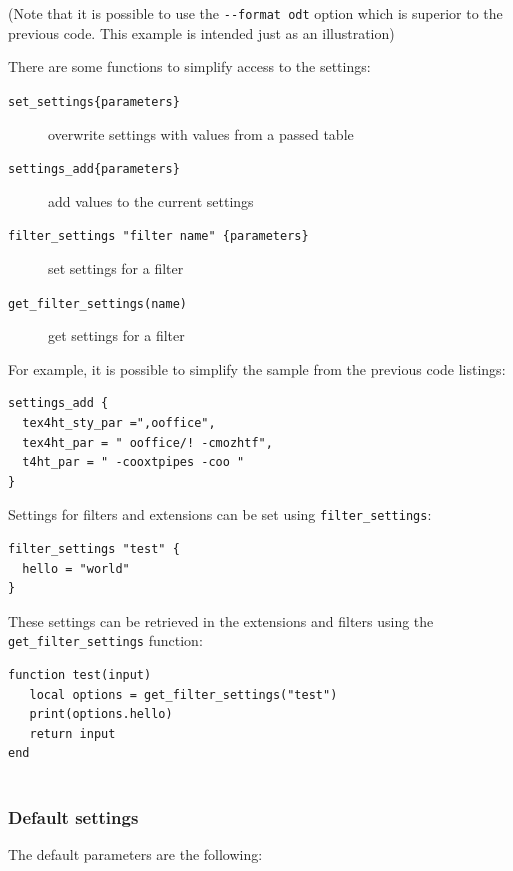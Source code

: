 (Note that it is possible to use the \texttt{-\/-format\ odt} option
which is superior to the previous code. This example is intended just as
an illustration)

There are some functions to simplify access to the settings:

\begin{description}
\item[\texttt{set\_settings\{parameters\}}]
overwrite settings with values from a passed table
\item[\texttt{settings\_add\{parameters\}}]
add values to the current settings
\item[\texttt{filter\_settings\ "filter\ name"\ \{parameters\}}]
set settings for a filter
\item[\texttt{get\_filter\_settings(name)}]
get settings for a filter
\end{description}

For example, it is possible to simplify the sample from the previous
code listings:

\begin{verbatim}
settings_add {
  tex4ht_sty_par =",ooffice",
  tex4ht_par = " ooffice/! -cmozhtf",
  t4ht_par = " -cooxtpipes -coo "
}
\end{verbatim}

Settings for filters and extensions can be set using
\texttt{filter\_settings}:

\begin{verbatim}
filter_settings "test" {
  hello = "world"
}
\end{verbatim}

These settings can be retrieved in the extensions and filters using the
\texttt{get\_filter\_settings} function:

\begin{verbatim}
function test(input)
   local options = get_filter_settings("test")
   print(options.hello)
   return input
end
   
\end{verbatim}

\subsubsection{Default settings}\label{default-settings}

The default parameters are the following:

